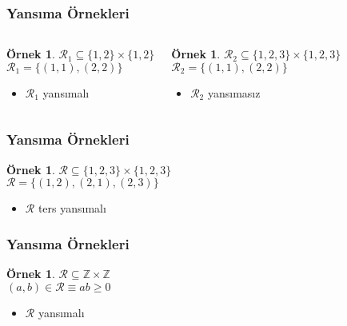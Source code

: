 \documentclass[dvipsnames]{beamer}
\theoremstyle{definition}
\theoremstyle{example}
\newtheorem{ornek}[theorem]{Örnek}
\theoremstyle{plain}
\begin{document}
\begin{frame}
  \frametitle{Yansıma Örnekleri}

  \begin{columns}[t]
    \begin{ornek}
      $\mathcal{R}_1 \subseteq \{1,2\} \times \{1,2\}$\\
      $\mathcal{R}_1 = \{(1,1), (2,2)\}$

      \medskip
      \begin{itemize}
        \item $\mathcal{R}_1$ yansımalı
      \end{itemize}
    \end{ornek}

    \pause
    \begin{ornek}
      $\mathcal{R}_2 \subseteq \{1,2,3\} \times \{1,2,3\}$\\
      $\mathcal{R}_2 = \{(1,1), (2,2)\}$

      \medskip
      \begin{itemize}
        \item $\mathcal{R}_2$ yansımasız
      \end{itemize}
    \end{ornek}
  \end{columns}
\end{frame}

\begin{frame}
  \frametitle{Yansıma Örnekleri}

  \begin{ornek}
    $\mathcal{R} \subseteq \{1,2,3\} \times \{1,2,3\}$\\
    $\mathcal{R} = \{(1,2), (2,1), (2,3)\}$

    \medskip
    \begin{itemize}
      \item $\mathcal{R}$ ters yansımalı
    \end{itemize}
  \end{ornek}
\end{frame}

\begin{frame}
  \frametitle{Yansıma Örnekleri}

  \begin{ornek}
    $\mathcal{R} \subseteq \mathbb{Z} \times \mathbb{Z}$\\
    $(a,b) \in \mathcal{R} \equiv ab \geq 0$

    \medskip
    \begin{itemize}
      \item $\mathcal{R}$ yansımalı
    \end{itemize}
  \end{ornek}
\end{frame}
\end{document}
